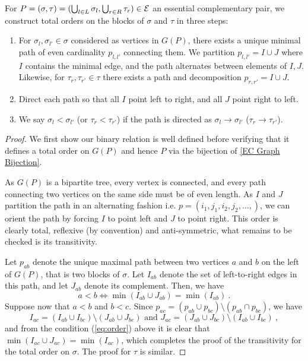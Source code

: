 \begin{construction} 
\label{const:total order on blocks of EC}
For $P=(\sigma,\tau) = (\bigcup_{l\in L}\sigma_l,\bigcup_{r\in R} \tau_r) \in \mathcal{E}$ an essential complementary pair, we construct total orders on the blocks of $\sigma$ and $\tau$ in three steps:
\begin{enumerate}
    \item For $\sigma_l,\sigma_{l'} \in \sigma$ considered as vertices in $G(P)$, there exists a unique minimal path of even cardinality $p_{l,l'}$ connecting them.
    We partition $p_{l,l'}=I\cup J$ where $I$ contains the minimal edge, and the path alternates between elements of $I,J$. Likewise, for $\tau_r,\tau_{r'}\in \tau$ there exists a path and decomposition $p_{r,r'} = I\cup J$.
    \item Direct each path so that all $I$ point left to right, and all $J$ point right to left.
    \item We say $\sigma_l< \sigma_{l'}$ (or $\tau_r < \tau_{r'}$) if the path is directed as $\sigma_l \to \sigma_{l'}$ ($\tau_r \to \tau_{r'}$).
\end{enumerate}
\end{construction}

\begin{proof}
We first show our binary relation is well defined before verifying that it defines a total order on $G(P)$ and hence $P$ via the bijection of \cref{EC Graph Bijection}.

As $G(P)$ is a bipartite tree, every vertex is connected, and every path connecting two vertices on the same side must be of even length. 
As $I$ and $J$ partition the path in an alternating fashion i.e. $p=(i_1,j_1,i_2,j_2,..., )$, we can orient the path by forcing $I$ to point left and $J$ to point right. 
This order is clearly total, reflexive (by convention) and anti-symmetric, what remains to be checked is its transitivity. 

Let $p_{ab}$ denote the unique maximal path between two vertices $a$ and $b$ on the left of $G(P)$, that is two blocks of $\sigma$. 
Let $I_{ab}$ denote the set of left-to-right edges in this path, and let $J_{ab}$ denote its complement. 
Then, we have 
\begin{equation}
    \label{eq:order}
    a < b \iff \min(I_{ab}\cup J_{ab})=\min(I_{ab}) \ . 
\end{equation}
Suppose now that $a < b$ and $b < c$.
Since $p_{ac}= (p_{ab} \cup p_{bc}) \setminus (p_{ab} \cap p_{bc})$, we have $$ I_{ac}=(I_{ab}\cup I_{bc}) \setminus (J_{ab} \cup J_{bc}) \text{ and } J_{ac}=(J_{ab}\cup J_{bc}) \setminus (I_{ab} \cup I_{bc}) \ , $$ and from the condition (\ref{eq:order}) above it is clear that $\min(I_{ac}\cup J_{ac})=\min(I_{ac})$, which completes the proof of the transitivity for the total order on $\sigma$. 
The proof for $\tau$ is similar. 
\end{proof}

